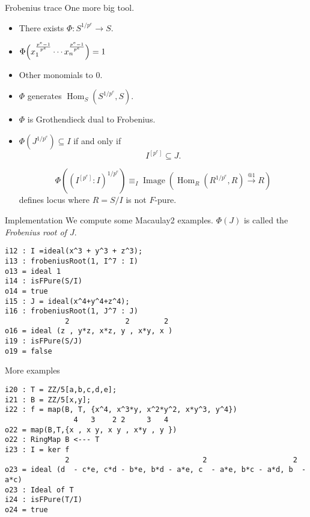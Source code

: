 \documentclass[xcolor=dvipsnames]{beamer}
\newcommand{\memph}[1]{{\color{Red}\emph{#1}}}
\DeclareMathOperator{\Hom}{Hom}
\DeclareMathOperator{\Image}{{Image}}
\theoremstyle{remark}
\begin{document}
\begin{frame}[c]{Frobenius trace}
  One more big tool.
  \begin{itemize}
    \item<2->  There exists $\Phi : S^{1/p^e} \to S$.
    \item<3->  $\Phi\Big(x_1^{p^e - 1 \over p^e} \cdots x_n^{p^e - 1 \over p^e}\Big) = 1$
    \item<4->  Other monomials to 0.
    \item<5->  $\Phi$ generates $\Hom_S(S^{1/p^e}, S)$.
    \item<6->  $\Phi$ is Grothendieck dual to Frobenius.
    \item<7->  $\Phi(J^{1/p^e}) \subseteq I$ if and only if
    \[
      I^{[p^e]} \subseteq J.
    \]
    \begin{theorem}
      \[
      \Phi((I^{[p^e]} : I)^{1/p^e}) \equiv_I \Image(\Hom_R(R^{1/p^e}, R) \xrightarrow{@1} R)
      \]
      defines locus where $R = S/I$ is not $F$-pure.
    \end{theorem}
  \end{itemize}
\end{frame}

\begin{frame}[fragile]{Implementation}
  We compute some Macaulay2 examples.  $\Phi(J)$ is called the \memph{Frobenius root of $J$}.
  \begin{verbatim}
i12 : I =ideal(x^3 + y^3 + z^3);
i13 : frobeniusRoot(1, I^7 : I)
o13 = ideal 1
i14 : isFPure(S/I)
o14 = true
i15 : J = ideal(x^4+y^4+z^4);
i16 : frobeniusRoot(1, J^7 : J)
              2             2        2
o16 = ideal (z , y*z, x*z, y , x*y, x )
i19 : isFPure(S/J)
o19 = false
  \end{verbatim}
\end{frame}

\begin{frame}[fragile]{More examples}
  \begin{verbatim}
i20 : T = ZZ/5[a,b,c,d,e];
i21 : B = ZZ/5[x,y];
i22 : f = map(B, T, {x^4, x^3*y, x^2*y^2, x*y^3, y^4})
                4   3    2 2     3   4
o22 = map(B,T,{x , x y, x y , x*y , y })
o22 : RingMap B <--- T
i23 : I = ker f
              2                               2                    2
o23 = ideal (d  - c*e, c*d - b*e, b*d - a*e, c  - a*e, b*c - a*d, b  - a*c)
o23 : Ideal of T
i24 : isFPure(T/I)
o24 = true
  \end{verbatim}
\end{frame}
\end{document}
